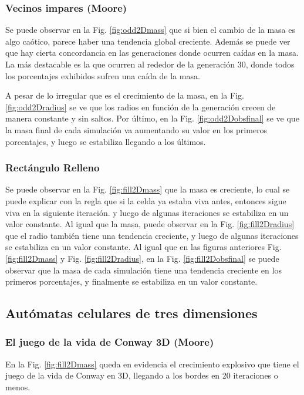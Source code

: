 \subsubsection{Vecinos impares (Moore)}
Se puede observar en la Fig. \ref{fig:odd2Dmass} que si bien el cambio de la masa es algo caótico, parece haber una tendencia global creciente.
Además se puede ver que hay cierta concordancia en las generaciones donde ocurren caídas en la masa. La más destacable es la que ocurren al rededor de la generación 30, donde todos los porcentajes exhibidos sufren una caída de la masa.

A pesar de lo irregular que es el crecimiento de la masa, en la Fig. \ref{fig:odd2Dradius} se ve que los radios en función de la generación crecen de manera constante y sin saltos.
Por último, en la Fig. \ref{fig:odd2Dobsfinal} se ve que la masa final de cada simulación va aumentando su valor en los primeros porcentajes, y luego se estabiliza llegando a los últimos.

\subsubsection{Rectángulo Relleno}
Se puede observar en la Fig. \ref{fig:fill2Dmass} que la masa es creciente, lo cual se puede explicar con la regla que si la celda ya estaba viva antes, entonces sigue viva en la siguiente iteración.  y luego de algunas iteraciones se estabiliza en un valor constante.
Al igual que la masa, puede observar en la Fig. \ref{fig:fill2Dradius} que el radio también tiene una tendencia creciente, y luego de algunas iteraciones se estabiliza en un valor constante.
Al igual que en las figuras anteriores Fig. \ref{fig:fill2Dmass} y Fig. \ref{fig:fill2Dradius}, en la Fig. \ref{fig:fill2Dobsfinal} se puede observar que la masa de cada simulación tiene una tendencia creciente en los primeros porcentajes, y finalmente se estabiliza en un valor constante.

\subsection{Autómatas celulares de tres dimensiones}
\label{subsec:results3d}

\subsubsection{El juego de la vida de Conway 3D (Moore)}
En la Fig. \ref{fig:fill2Dmass} queda en evidencia el crecimiento explosivo que tiene el juego de la vida de Conway en 3D, llegando a los bordes en 20 iteraciones o menos.

